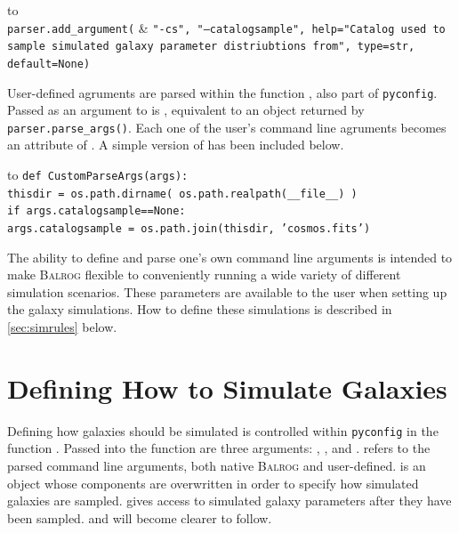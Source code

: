 \documentclass[12pt]{book}
\newcommand{\pyconfig}{\texttt{pyconfig}}
\newcommand{\balrog}{\textsc{Balrog}}
\begin{document}
\setlength{\tabcolsep}{0pt}
\begin{longtabu*} to \linewidth {l X}
\\
\hspace{20pt} \texttt{parser.add\_argument(} & \texttt{"-cs", "--catalogsample", help="Catalog used to
sample simulated galaxy parameter distriubtions from", type=str, default=None)}
\end{longtabu*}
\setlength{\tabcolsep}{6pt}
\addtocounter{table}{-1}


User-defined agruments are parsed within the function \parsefunc{},
also part of \pyconfig{}.
Passed as an argument to \parsefunc{} is \parseargs{}, equivalent
to an object returned by \texttt{parser.parse\_args()}. Each one of the user's 
command line agruments becomes an attribute of \parseargs{}. 
A simple version of \parsefunc{} has been included below.

\setlength{\tabcolsep}{0pt}
\begin{longtabu*} to \linewidth {X}
\texttt{def CustomParseArgs(args):}\\
\hspace{20pt} \texttt{thisdir = os.path.dirname( os.path.realpath(\_\_file\_\_) )} \\
\hspace{20pt} \texttt{if args.catalogsample==None:} \\
\hspace{40pt} \texttt{args.catalogsample = os.path.join(thisdir, 'cosmos.fits')}
\end{longtabu*}
\setlength{\tabcolsep}{6pt}
\addtocounter{table}{-1}

\noindent The ability to define and parse one's own command line arguments is intended to make
\balrog{} flexible to conveniently running a wide variety of different
simulation scenarios. These parameters are available to the user 
when setting up the galaxy simulations. How to define these simulations is described in
\autoref{sec:simrules} below.

\section{Defining How to Simulate Galaxies}
\label{sec:simrules}

Defining how galaxies should be simulated is controlled within \pyconfig{}
in the function \simfunc{}. Passed into the function are three
arguments: \simargs{}, \simrules{}, and \simsamp{}.
\simargs{} refers to the parsed command line arguments,
both native \balrog{} and user-defined.
\simrules{} is an object whose components are overwritten
in order to specify how simulated galaxies are sampled.
\simsamp{} gives access to simulated galaxy parameters
after they have been sampled. \simrules{} and \simsamp{}
will become clearer to follow.
\end{document}

